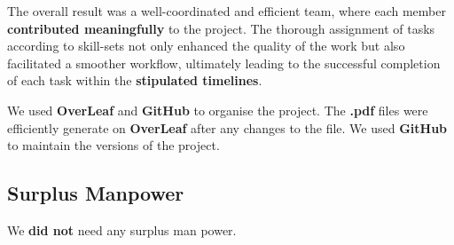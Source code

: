 The overall result was a well-coordinated and efficient team, where each member \textbf{contributed meaningfully} to the project. The thorough assignment of tasks according to skill-sets not only enhanced the quality of the work but also facilitated a smoother workflow, ultimately leading to the successful completion of each task within the \textbf{stipulated timelines}.


We used \textbf{OverLeaf} and \textbf{GitHub} to organise the project. The \textbf{.pdf} files were efficiently generate on \textbf{OverLeaf} after any changes to the file. We used \textbf{GitHub} to maintain the versions of the project. 


\subsection{Surplus Manpower}
We \textbf{did not} need any surplus man power.
